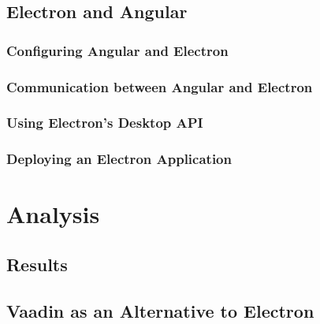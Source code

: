 \documentclass[11pt]{article}
\begin{document}
    \subsection{Electron and Angular}\label{subsec:developing-with-electron-angular}
    
    \clearpage
    \subsubsection{Configuring Angular and Electron}\label{subsubsec:developing-with-electron-angular-config}
    
    \clearpage
    \subsubsection{Communication between Angular and Electron}\label{subsubsec:developing-with-electron-angular-communication}
    
    \clearpage
    \subsubsection{Using Electron's Desktop API}\label{subsubsec:developing-with-electron-angular-api}
    
    \clearpage
    \subsubsection{Deploying an Electron Application}\label{subsubsec:dev-project}
    

    \section{Analysis}\label{sec:analysis}

    \subsection{Results}\label{subsec:results}

    \subsection{Vaadin as an Alternative to Electron}\label{subsec:vaadin-electron}
    \clearpage
    \printnoidxglossary[type=\acronymtype]
    \clearpage
    \listoffigures
    \clearpage
    \lstlistoflistings
    \clearpage
    \printbibliography
    
    
\end{document}
